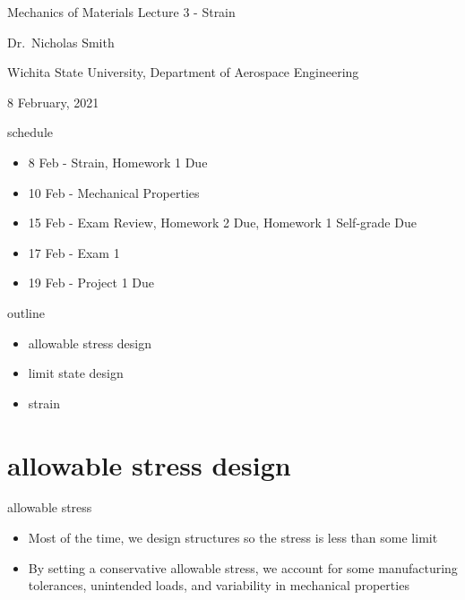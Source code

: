 \documentclass[
  letterpaper,
  ignorenonframetext,
  aspectratio=43,
  handout,
  12pt]{beamer}
\author{}
\date{}
\providecommand{\tightlist}{%
  \setlength{\itemsep}{0pt}\setlength{\parskip}{0pt}}
\providecommand{\tightlist}{%
\setlength{\itemsep}{0pt}\setlength{\parskip}{0pt}}
\begin{document}
\begin{frame}{Mechanics of Materials}
\protect\hypertarget{mechanics-of-materials}{}
Lecture 3 - Strain

Dr.~Nicholas Smith

Wichita State University, Department of Aerospace Engineering

8 February, 2021
\end{frame}

\begin{frame}{schedule}
\protect\hypertarget{schedule}{}
\begin{itemize}
\tightlist
\item
  8 Feb - Strain, Homework 1 Due
\item
  10 Feb - Mechanical Properties
\item
  15 Feb - Exam Review, Homework 2 Due, Homework 1 Self-grade Due
\item
  17 Feb - Exam 1
\item
  19 Feb - Project 1 Due
\end{itemize}
\end{frame}

\begin{frame}{outline}
\protect\hypertarget{outline}{}
\begin{itemize}
\tightlist
\item
  allowable stress design
\item
  limit state design
\item
  strain
\end{itemize}
\end{frame}

\hypertarget{allowable-stress-design}{%
\section{allowable stress design}\label{allowable-stress-design}}

\begin{frame}{allowable stress}
\protect\hypertarget{allowable-stress}{}
\begin{itemize}
\tightlist
\item
  Most of the time, we design structures so the stress is less than some
  limit
\item
  By setting a conservative allowable stress, we account for some
  manufacturing tolerances, unintended loads, and variability in
  mechanical properties
\end{itemize}
\end{frame}
\end{document}
